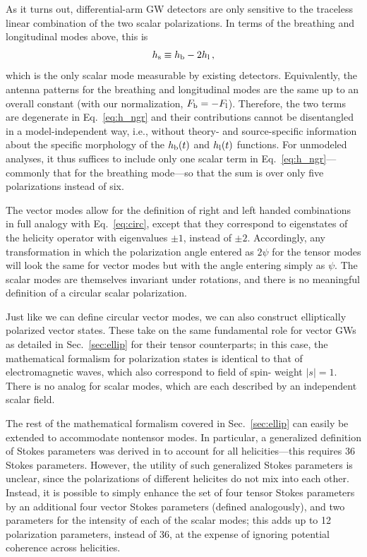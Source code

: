 \documentclass[aps,prd,twocolumn,superscriptaddress,preprintnumbers,floatfix,nofootinbib]{revtex4-2}
\newcommand{\beq}{\begin{equation}}
\newcommand{\eeq}{\end{equation}}
\newcommand*{\eq}[1]{Eq.~\eqref{eq:#1}}
\begin{document}
As it turns out, differential-arm GW detectors are only sensitive to the traceless linear combination of the two scalar polarizations.
In terms of the breathing and longitudinal modes above, this is
\beq
h_{\rm s} \equiv \hb - 2\hlon\, ,
\eeq
which is the only scalar mode measurable by existing detectors.
Equivalently, the antenna patterns for the breathing and longitudinal modes are the same up to an overall constant (with our normalization, $F_{{\rm b}} = -F_{{\rm l}}$).
Therefore, the two terms are degenerate in Eq.~\eqref{eq:h_ngr} and their contributions cannot be disentangled in a model-independent way, i.e., without theory- and source-specific information about the specific morphology of the $h_{{\rm b}}(t)$ and $h_{{\rm l}}(t)$ functions.
For unmodeled analyses, it thus suffices to include only one scalar term in Eq.~\eqref{eq:h_ngr}---commonly that for the breathing mode---so that the sum is over only five polarizations instead of six.

The vector modes allow for the definition of right and left handed combinations in full analogy with \eq{circ}, except that they correspond to eigenstates of the helicity operator with eigenvalues $\pm 1$, instead of $\pm 2$.
Accordingly, any transformation in which the polarization angle entered as $2\psi$ for the tensor modes will look the same for vector modes but with the angle entering simply as $\psi$.
The scalar modes are themselves invariant under rotations, and there is no meaningful definition of a circular scalar polarization.

Just like we can define circular vector modes, we can also construct elliptically polarized vector states.
These take on the same fundamental role for vector GWs as detailed in Sec.~\ref{sec:ellip} for their tensor counterparts; in this case, the mathematical formalism for polarization states is identical to that of electromagnetic waves, which also correspond to field of spin- weight $\left|s\right|=1$.
There is no analog for scalar modes, which are each described by an independent scalar field.

The rest of the mathematical formalism covered in Sec.~\ref{sec:ellip} can easily be extended to accommodate nontensor modes.
In particular, a generalized definition of Stokes parameters was derived in \cite{Anile:1974} to account for all helicities---this requires 36 Stokes parameters.
However, the utility of such generalized Stokes parameters is unclear, since the polarizations of different helicites do not mix into each other.
Instead, it is possible to simply enhance the set of four tensor Stokes parameters by an additional four vector Stokes parameters (defined analogously), and two parameters for the intensity of each of the scalar modes;
this adds up to 12 polarization parameters, instead of 36, at the expense of ignoring potential coherence across helicities.
\end{document}
